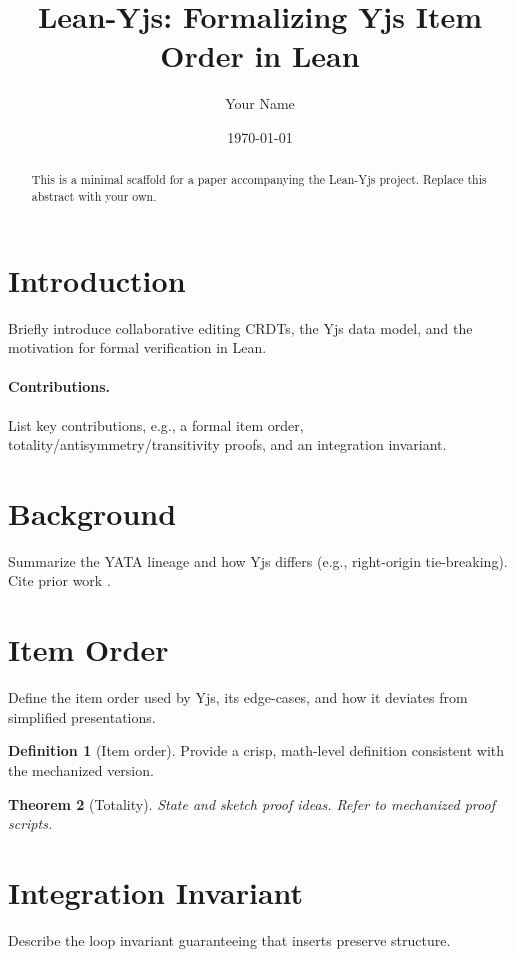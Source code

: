 \documentclass[11pt]{article}
\title{Lean-Yjs: Formalizing Yjs Item Order in Lean}
\author{Your Name}
\date{\today}
\theoremstyle{plain}
\newtheorem{theorem}{Theorem}
\theoremstyle{definition}
\newtheorem{definition}[theorem]{Definition}
\theoremstyle{remark}
\newcommand{\Lean}{\textsf{Lean}}  %
\newcommand{\Yjs}{\textsf{Yjs}}
\begin{document}
\maketitle

\begin{abstract}
This is a minimal scaffold for a paper accompanying the Lean-Yjs project. Replace this abstract with your own.
\end{abstract}

\section{Introduction}
Briefly introduce collaborative editing CRDTs, the \Yjs{} data model, and the motivation for formal verification in \Lean{}.

\paragraph{Contributions.} List key contributions, e.g., a formal item order, totality/antisymmetry/transitivity proofs, and an integration invariant.

\section{Background}
Summarize the YATA lineage and how \Yjs{} differs (e.g., right-origin tie-breaking). Cite prior work \citep{yata}.

\section{Item Order}
Define the item order used by \Yjs{}, its edge-cases, and how it deviates from simplified presentations.

\begin{definition}[Item order]
Provide a crisp, math-level definition consistent with the mechanized version.
\end{definition}

\begin{theorem}[Totality]
State and sketch proof ideas. Refer to mechanized proof scripts.
\end{theorem}

\section{Integration Invariant}
Describe the loop invariant guaranteeing that inserts preserve structure.
\end{document}
